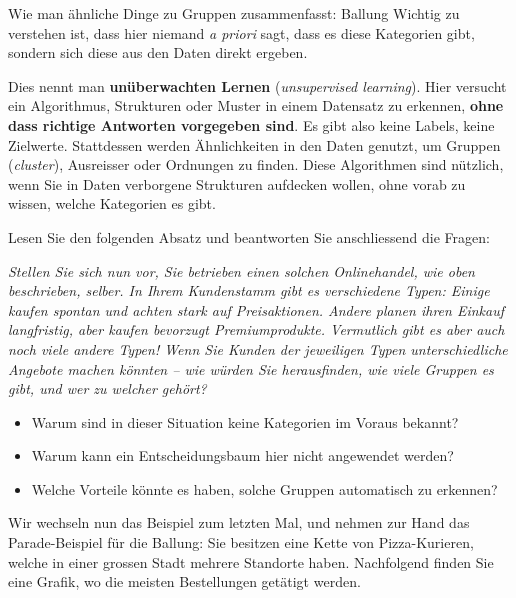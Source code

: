 \begin{lpu}{Wie man ähnliche Dinge zu Gruppen zusammenfasst: Ballung}
Wichtig zu verstehen ist, dass hier niemand \textit{a priori} sagt, dass es diese Kategorien gibt, sondern sich diese aus den Daten direkt ergeben. 

\begin{theorie}
Dies nennt man \textbf{unüberwachten Lernen} (\emph{unsupervised learning}). Hier versucht ein Algorithmus, Strukturen oder Muster in einem Datensatz zu erkennen, \textbf{ohne dass richtige Antworten vorgegeben sind}. Es gibt also keine Labels, keine Zielwerte. Stattdessen werden Ähnlichkeiten in den Daten genutzt, um Gruppen (\textit{cluster}), Ausreisser oder Ordnungen zu finden. Diese Algorithmen sind nützlich, wenn Sie in Daten verborgene Strukturen aufdecken wollen, ohne vorab zu wissen, welche Kategorien es gibt.
\end{theorie} 


\begin{aufgabe}{1}
Lesen Sie den folgenden Absatz und beantworten Sie anschliessend die Fragen:

\emph{Stellen Sie sich nun vor, Sie betrieben einen solchen Onlinehandel, wie oben beschrieben, selber. In Ihrem Kundenstamm gibt es verschiedene Typen: Einige kaufen spontan und achten stark auf Preisaktionen. Andere planen ihren Einkauf langfristig, aber kaufen bevorzugt Premiumprodukte. Vermutlich gibt es aber auch noch viele andere Typen! Wenn Sie Kunden der jeweiligen Typen unterschiedliche Angebote machen könnten – wie würden Sie herausfinden, wie viele Gruppen es gibt, und wer zu welcher gehört?}

\begin{itemize}
  \item Warum sind in dieser Situation keine Kategorien im Voraus bekannt?
  \item Warum kann ein Entscheidungsbaum hier nicht angewendet werden?
  \item Welche Vorteile könnte es haben, solche Gruppen automatisch zu erkennen?
\end{itemize}
\end{aufgabe}

Wir wechseln nun das Beispiel zum letzten Mal, und nehmen zur Hand das Parade-Beispiel für die Ballung: Sie besitzen eine Kette von Pizza-Kurieren, welche in einer grossen Stadt mehrere Standorte haben. Nachfolgend finden Sie eine Grafik, wo die meisten Bestellungen getätigt werden. 

\begin{figure}[h]
\centering
{}
\end{figure}
\end{lpu}
